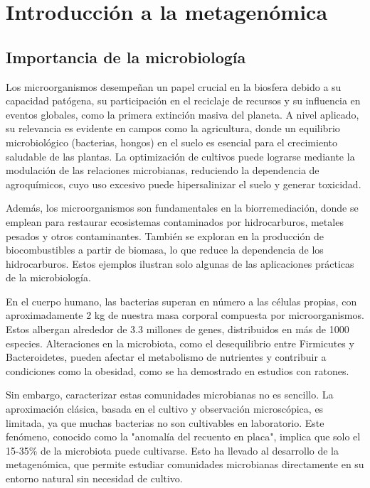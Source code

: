 \chapter{Introducción a la metagenómica}
\section{Importancia de la microbiología}
Los microorganismos desempeñan un papel crucial en la biosfera debido a su capacidad patógena, su participación en el reciclaje de recursos y su influencia en eventos globales, como la primera extinción masiva del planeta. A nivel aplicado, su relevancia es evidente en campos como la agricultura, donde un equilibrio microbiológico (bacterias, hongos) en el suelo es esencial para el crecimiento saludable de las plantas. La optimización de cultivos puede lograrse mediante la modulación de las relaciones microbianas, reduciendo la dependencia de agroquímicos, cuyo uso excesivo puede hipersalinizar el suelo y generar toxicidad.

Además, los microorganismos son fundamentales en la biorremediación, donde se emplean para restaurar ecosistemas contaminados por hidrocarburos, metales pesados y otros contaminantes. También se exploran en la producción de biocombustibles a partir de biomasa, lo que reduce la dependencia de los hidrocarburos. Estos ejemplos ilustran solo algunas de las aplicaciones prácticas de la microbiología.

En el cuerpo humano, las bacterias superan en número a las células propias, con aproximadamente 2 kg de nuestra masa corporal compuesta por microorganismos. Estos albergan alrededor de 3.3 millones de genes, distribuidos en más de 1000 especies. Alteraciones en la microbiota, como el desequilibrio entre Firmicutes y Bacteroidetes, pueden afectar el metabolismo de nutrientes y contribuir a condiciones como la obesidad, como se ha demostrado en estudios con ratones.

Sin embargo, caracterizar estas comunidades microbianas no es sencillo. La aproximación clásica, basada en el cultivo y observación microscópica, es limitada, ya que muchas bacterias no son cultivables en laboratorio. Este fenómeno, conocido como la "anomalía del recuento en placa", implica que solo el 15-35\% de la microbiota puede cultivarse. Esto ha llevado al desarrollo de la metagenómica, que permite estudiar comunidades microbianas directamente en su entorno natural sin necesidad de cultivo.

